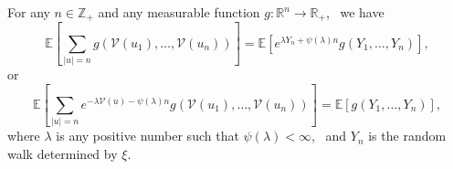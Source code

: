 \begin{lemma}
For any $n\in\mathbb Z_+$ and any measurable function $g:\mathbb R^n\to\mathbb R_+$,~ we have
\begin{equation*}
    \mathbb E\left[
        \sum_{|u|=n}
        g(\mathcal V(u_1),\ldots,\mathcal V(u_n))
    \right]
    =
    \mathbb E\left[
        e^{\lambda Y_n+\psi(\lambda)n}g(Y_1,\ldots,Y_n)
    \right],
\end{equation*}
or
\begin{equation*}
    \mathbb E\left[
        \sum_{|u|=n}
        e^{-\lambda \mathcal V(u)-\psi(\lambda)n}
        g(\mathcal V(u_1),\ldots,\mathcal V(u_n))
    \right]
    =
    \mathbb E\left[
        g(Y_1,\ldots,Y_n)
    \right],
\end{equation*}
where $\lambda$ is any positive number such that $\psi(\lambda)<\infty$,~ and $Y_n$ is the random walk determined by $\xi$.
\end{lemma}
